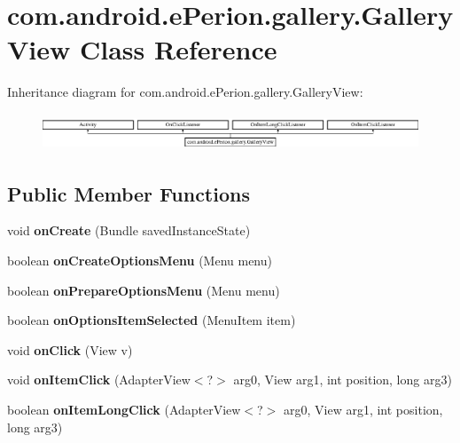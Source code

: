 \section{com.\-android.\-e\-Perion.\-gallery.\-Gallery\-View Class Reference}
\label{classcom_1_1android_1_1e_perion_1_1gallery_1_1_gallery_view}
Inheritance diagram for com.\-android.\-e\-Perion.\-gallery.\-Gallery\-View\-:\begin{figure}[H]
\begin{center}
\leavevmode
\includegraphics[height=1.102362cm]{classcom_1_1android_1_1e_perion_1_1gallery_1_1_gallery_view}
\end{center}
\end{figure}
\subsection*{Public Member Functions}
\begin{DoxyCompactItemize}
\item 
void {\bfseries on\-Create} (Bundle saved\-Instance\-State)\label{classcom_1_1android_1_1e_perion_1_1gallery_1_1_gallery_view_a4da474d2228ae213acf6a351663447d9}

\item 
boolean {\bfseries on\-Create\-Options\-Menu} (Menu menu)\label{classcom_1_1android_1_1e_perion_1_1gallery_1_1_gallery_view_a280f72f30c1ec9f2af7eca769b2afb0b}

\item 
boolean {\bfseries on\-Prepare\-Options\-Menu} (Menu menu)\label{classcom_1_1android_1_1e_perion_1_1gallery_1_1_gallery_view_a759ccef424fdd49e21b8d1a21601301d}

\item 
boolean {\bfseries on\-Options\-Item\-Selected} (Menu\-Item item)\label{classcom_1_1android_1_1e_perion_1_1gallery_1_1_gallery_view_a4bfab27a6df767632b090436ff73d5d6}

\item 
void {\bfseries on\-Click} (View v)\label{classcom_1_1android_1_1e_perion_1_1gallery_1_1_gallery_view_add80190fb06fd2c964750cc468824996}

\item 
void {\bfseries on\-Item\-Click} (Adapter\-View$<$?$>$ arg0, View arg1, int position, long arg3)\label{classcom_1_1android_1_1e_perion_1_1gallery_1_1_gallery_view_a0fadf5bda8e9866bb1028045e70575ae}

\item 
boolean {\bfseries on\-Item\-Long\-Click} (Adapter\-View$<$?$>$ arg0, View arg1, int position, long arg3)\label{classcom_1_1android_1_1e_perion_1_1gallery_1_1_gallery_view_a2e795ac76f2c244f6d62d8c0cb7f8574}

\end{DoxyCompactItemize}


